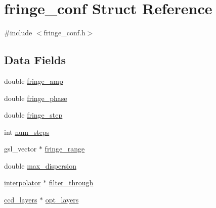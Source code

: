\hypertarget{structfringe__conf}{
\section{fringe\_\-conf Struct Reference}
\label{structfringe__conf}
}


{\ttfamily \#include $<$fringe\_\-conf.h$>$}\subsection*{Data Fields}
\begin{DoxyCompactItemize}
\item 
double \hyperlink{structfringe__conf_a82769d872faed1af21769411078d76f5}{fringe\_\-amp}
\item 
double \hyperlink{structfringe__conf_a063f94aa831f45434151fcd07e18a05d}{fringe\_\-phase}
\item 
double \hyperlink{structfringe__conf_aa2e4fd8fec88650b18a12372ef85ba4b}{fringe\_\-step}
\item 
int \hyperlink{structfringe__conf_a0a5158dd39ecd3e68e88853f6b33014c}{num\_\-steps}
\item 
gsl\_\-vector $\ast$ \hyperlink{structfringe__conf_aa96d6742b1e0009ca830907949e8875b}{fringe\_\-range}
\item 
double \hyperlink{structfringe__conf_ab903b587c97228de58c582f8c115cc85}{max\_\-dispersion}
\item 
\hyperlink{structinterpolator}{interpolator} $\ast$ \hyperlink{structfringe__conf_abe82bcdcd21b328bb374df7b1af43153}{filter\_\-through}
\item 
\hyperlink{structccd__layers}{ccd\_\-layers} $\ast$ \hyperlink{structfringe__conf_a82eebf75b191ca25f824437be6f23c51}{opt\_\-layers}
\end{DoxyCompactItemize}


